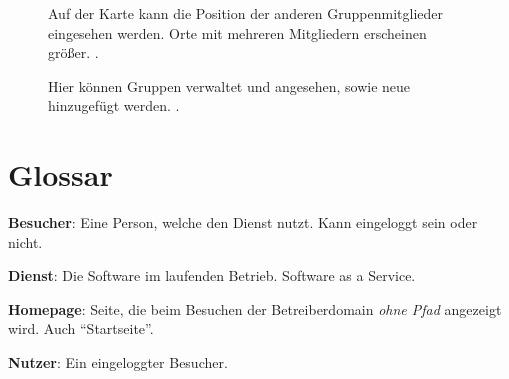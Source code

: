 \documentclass[parskip=full,11pt]{scrartcl}
\begin{document}
\begin{figure}[hb]
		\caption{\label{fig:map}
			Auf der Karte kann die Position der anderen Gruppenmitglieder eingesehen werden.
			Orte mit mehreren Mitgliedern erscheinen größer.
			.
		}
\end{figure}

\begin{figure}[hb]
		\caption{\label{fig:groups}
			Hier können Gruppen verwaltet und angesehen, sowie neue hinzugefügt werden.
			.
		}
\end{figure}

\section{Glossar}

\textbf{Besucher}:
Eine Person, welche den Dienst nutzt.
Kann eingeloggt sein oder nicht.

\textbf{Dienst}:
Die Software im laufenden Betrieb. Software as a Service.

\textbf{Homepage}:
Seite, die beim Besuchen der Betreiberdomain \emph{ohne Pfad} angezeigt wird. Auch \enquote{Startseite}.

\textbf{Nutzer}:
Ein eingeloggter Besucher.
\end{document}
